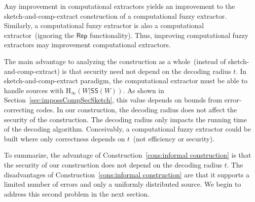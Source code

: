 \documentclass[11pt]{article}
\newcommand{\secref}[1]{\mbox{Section~\ref{#1}}}
\newcommand{\consref}[1]{\mbox{Construction~\ref{#1}}}
\newcommand{\class}[1]{{\ensuremath{\mathsf{#1}}}}
\newcommand{\rep}{\ensuremath{\class{Rep}}\xspace}
\newcommand{\sketch}{\ensuremath{\class{SS}}\xspace}
\newcommand{\Hoo}{\mathrm{H}_\infty}
\begin{document}
Any improvement in computational extractors yields an improvement to the sketch-and-comp-extract construction of a computational fuzzy extractor.  Similarly, a computational fuzzy extractor is also a computational extractor~(ignoring the \rep functionality).  Thus, improving computational fuzzy extractors may improvement computational extractors.  

The main advantage to analyzing the construction as a whole~(instead of sketch-and-comp-extract) is that security need not depend on the decoding radius $t$.  In sketch-and-comp-extract paradigm, the computational extractor must be able to handle sources with $\Hoo(W| \sketch(W))$.  As shown in \secref{sec:impossCompSecSketch}, this value depends on bounds from error-correcting codes.  In our construction, the decoding radius does not affect the security of the construction.  The decoding radius only impacts the running time of the decoding algorithm.  Conceivably, a computational fuzzy extractor could be built where only correctness depends on $t$~(not efficiency or security).

To summarize, the advantage of \consref{cons:informal construction} is that the security of our construction does not depend on the decoding radius $t$.  
The disadvantages of \consref{cons:informal construction} are that it supports a limited number of errors and only a uniformly distributed source.  We begin to address this second problem in the next section.
\end{document}
